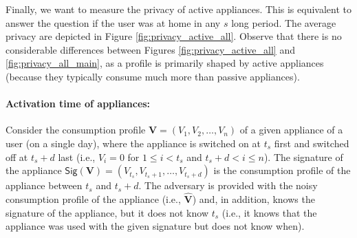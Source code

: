 \documentclass[11pt,a4paper]{article}
\theoremstyle{plain}
\theoremstyle{plain}
\theoremstyle{plain}
\theoremstyle{plain}
\theoremstyle{nonumberplain} \theoremseparator{}
\newcommand{\sig}{\ensuremath{\mathsf{Sig}}\xspace}
\begin{document}
Finally, we want to measure the privacy of active appliances. This is equivalent to answer the question if the user was at home in any $s$ long period. The average privacy are depicted in Figure \ref{fig:privacy_active_all}. Observe that there is no considerable differences between Figures \ref{fig:privacy_active_all} and \ref{fig:privacy_all_main}, as a profile is primarily shaped by active appliances (because they typically consume much more than passive appliances). 



\paragraph{Activation time of appliances:}
Consider the consumption profile $\mathbf{V}=(V_1, V_2, \ldots, V_n)$ of a given appliance of a user (on a single day), where the appliance is switched on at $t_{s}$ first and switched off at $t_s+d$ last (i.e., $V_i =0$ for $1 \leq i < t_s$ and $t_s+d < i \leq n$).
The signature of the appliance $\sig(\mathbf{V}) = (V_{t_s}, V_{t_s+1}, \ldots, V_{t_s+d})$ is the consumption profile of the appliance between $t_{s}$ and $t_{s}+d$.
The adversary is provided with the noisy consumption profile of the appliance (i.e., $\hat{\mathbf{V}}$) and, in addition, knows the signature of the appliance, but it does not know $t_{s}$	
(i.e., it knows that the appliance was used with the given signature but does not know when).
\end{document}
